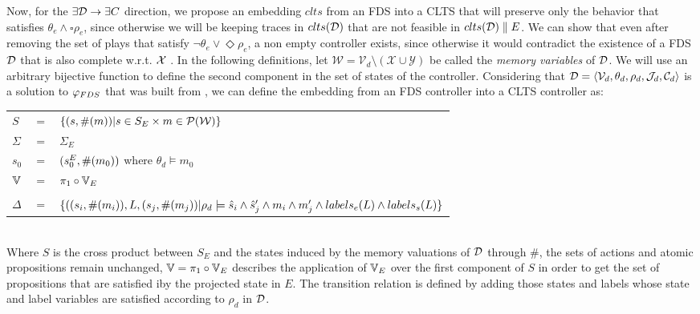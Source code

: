 Now,  for the $\exists \mathcal{D} \rightarrow \exists C$ direction, we propose an embedding $clts$ from an FDS into a CLTS that will preserve only the behavior that satisfies $\theta_e \wedge \square \rho_e$, since otherwise we will be keeping traces in $clts(\mathcal{D})$ that are not feasible in $clts(\mathcal{D})\parallel E$. We can show that even after removing the set of plays that satisfy $\neg \theta_e \vee \Diamond \rho_e$, a non empty controller exists, since otherwise it would contradict the existence of a FDS $\mathcal{D}$ that is also complete w.r.t. ${\mathcal{X}}$ . In the following definitions, let $\mathcal{W}= \mathcal{V}_d\setminus (\mathcal{X} \cup \mathcal{Y})$ be called the \emph{memory variables} of $\mathcal{D}$. We will use an arbitrary bijective function \enumSetDef to define the second component in the set of states of the controller. Considering that  $\mathcal{D}= \langle \mathcal{V}_d, \theta_d, \rho_d, \mathcal{J}_d, \mathcal{C}_d\rangle$ is a solution to $\varphi_{FDS}$ that was built from \controlProblemDef,  we can define the embedding from an FDS controller \fdsD into a CLTS controller \cltsEmbeddingDef{\fdsD}  as:

\vspace{1em}
\begin{tabular}{ l c l }
	$S$ &$=$& $\{(s,\#(m)) | s \in S_E \times m \in \mathcal{P}(\mathcal{W}) \}$\\
	$\Sigma$ &$=$&$\Sigma_E$\\	
	$s_0$&$=$&$(s_0^{E}, \#(m_0))$ where $\theta_d \models m_0$ \\
	$\mathbb{V}$&$=$&$\pi_1 \circ \mathbb{V}_E$\\
	&&\\
	$\Delta$&$=$&$\{((s_i,\#(m_i)),L,(s_j,\#(m_j))| \rho_d \models \hat{s}_{i} \wedge \hat{s}_{j}' \wedge m_i \wedge m_j' \wedge labels_e(L) \wedge labels_s(L) \}$\\
\end{tabular}
\vspace{1em}
\\
Where $S$ is the cross product between $S_E$ and the states induced by the memory valuations of $\mathcal{D}$ through $\#$, the sets of actions and atomic propositions remain unchanged, $\mathbb{V}=\pi_1 \circ \mathbb{V}_E$ describes the application of $\mathbb{V}_E$ over the first component of $S$ in order to get the set of propositions that are satisfied iby the projected state in $E$. The transition relation is defined by adding those states and labels whose state and label variables are satisfied according to $\rho_d$ in $\mathcal{D}$.

